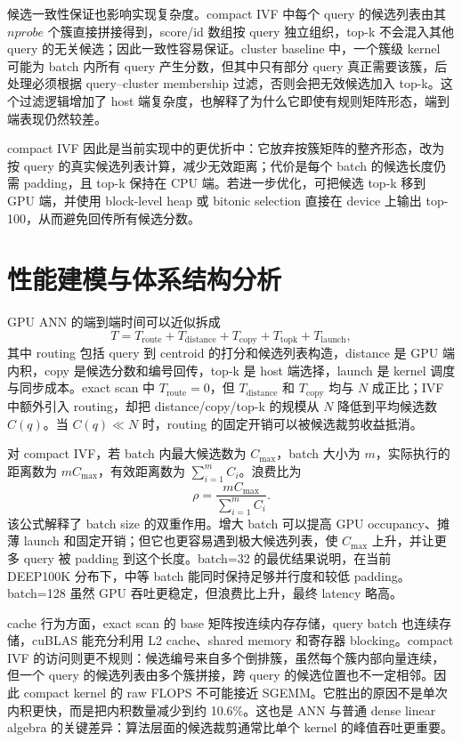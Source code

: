 \documentclass[10pt,a4paper]{article}
\begin{document}
候选一致性保证也影响实现复杂度。compact IVF 中每个 query 的候选列表由其 $nprobe$ 个簇直接拼接得到，score/id 数组按 query 独立组织，top-k 不会混入其他 query 的无关候选；因此一致性容易保证。cluster baseline 中，一个簇级 kernel 可能为 batch 内所有 query 产生分数，但其中只有部分 query 真正需要该簇，后处理必须根据 query--cluster membership 过滤，否则会把无效候选加入 top-k。这个过滤逻辑增加了 host 端复杂度，也解释了为什么它即使有规则矩阵形态，端到端表现仍然较差。

compact IVF 因此是当前实现中的更优折中：它放弃按簇矩阵的整齐形态，改为按 query 的真实候选列表计算，减少无效距离；代价是每个 batch 的候选长度仍需 padding，且 top-k 保持在 CPU 端。若进一步优化，可把候选 top-k 移到 GPU 端，并使用 block-level heap 或 bitonic selection 直接在 device 上输出 top-100，从而避免回传所有候选分数。

\section{性能建模与体系结构分析}

GPU ANN 的端到端时间可以近似拆成
\[
T = T_{\mathrm{route}} + T_{\mathrm{distance}} + T_{\mathrm{copy}} + T_{\mathrm{topk}} + T_{\mathrm{launch}},
\]
其中 routing 包括 query 到 centroid 的打分和候选列表构造，distance 是 GPU 端内积，copy 是候选分数和编号回传，top-k 是 host 端选择，launch 是 kernel 调度与同步成本。exact scan 中 $T_{\mathrm{route}}=0$，但 $T_{\mathrm{distance}}$ 和 $T_{\mathrm{copy}}$ 均与 $N$ 成正比；IVF 中额外引入 routing，却把 distance/copy/top-k 的规模从 $N$ 降低到平均候选数 $C(q)$。当 $C(q)\ll N$ 时，routing 的固定开销可以被候选裁剪收益抵消。

对 compact IVF，若 batch 内最大候选数为 $C_{\max}$，batch 大小为 $m$，实际执行的距离数为 $mC_{\max}$，有效距离数为 $\sum_{i=1}^{m} C_i$。浪费比为
\[
    \rho = \frac{mC_{\max}}{\sum_{i=1}^{m} C_i}.
\]
该公式解释了 batch size 的双重作用。增大 batch 可以提高 GPU occupancy、摊薄 launch 和固定开销；但它也更容易遇到极大候选列表，使 $C_{\max}$ 上升，并让更多 query 被 padding 到这个长度。batch=32 的最优结果说明，在当前 DEEP100K 分布下，中等 batch 能同时保持足够并行度和较低 padding。batch=128 虽然 GPU 吞吐更稳定，但浪费比上升，最终 latency 略高。

cache 行为方面，exact scan 的 base 矩阵按连续内存存储，query batch 也连续存储，cuBLAS 能充分利用 L2 cache、shared memory 和寄存器 blocking。compact IVF 的访问则更不规则：候选编号来自多个倒排簇，虽然每个簇内部向量连续，但一个 query 的候选列表由多个簇拼接，跨 query 的候选位置也不一定相邻。因此 compact kernel 的 raw FLOPS 不可能接近 SGEMM。它胜出的原因不是单次内积更快，而是把内积数量减少到约 10.6\%。这也是 ANN 与普通 dense linear algebra 的关键差异：算法层面的候选裁剪通常比单个 kernel 的峰值吞吐更重要。
\end{document}
